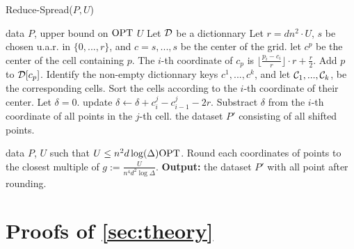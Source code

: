 \begin{algorithm}[tb]
   \caption{Reduce-Spread($P, U$)}
   \label{alg:reduce-diam}
\begin{algorithmic}[1]
 \Comment data $P$, upper bound on $\text{OPT}$ $U$
   \State Let $\mathcal D$ be a dictionnary
   \State Let $r = d n^2\cdot U$, $s$ be chosen u.a.r. in $\{0, ..., r\}$, and $c = {s, ..., s}$ be the center of the grid.
   \State let $c^p$ be the center of the cell containing $p$. The $i$-th coordinate of $c_p$ is $\lfloor \frac{p_i - c_i}{r}\rfloor  \cdot r + \frac{r}{2}$.
   Add $p$ to $\mathcal D[c_p]$.
   \EndFor
   \State Identify the non-empty dictionnary keys $c^1, ..., c^k$, and let $\mathcal C_1, ..., \mathcal C_k$, be the corresponding cells.
   \State Sort the cells according to the $i$-th coordinate of their center. Let $\delta = 0$. 
     update $\delta \gets \delta + c^j_i - c^j_{i-1} - 2r$.
	\EndIf    
    \State Substract $\delta$ from the $i$-th coordinate of all points in the $j$-th cell. 
    \EndFor
   \EndFor
    the dataset $P'$ consisting of all shifted points.
   \EndProcedure
   
    \Comment data $P$, $U$ such that $U \leq n^2 d \log(\Delta) \text{OPT}$.
   \State Round each coordinates of points to the closest multiple of $g := \frac{U}{n^4 d^2 \log \Delta}$.
   \State \textbf{Output:} the dataset $P'$ with all point after rounding.
   \EndProcedure
\end{algorithmic}
\end{algorithm}

\section{Proofs of \cref{sec:theory}}\label{app:theory}

